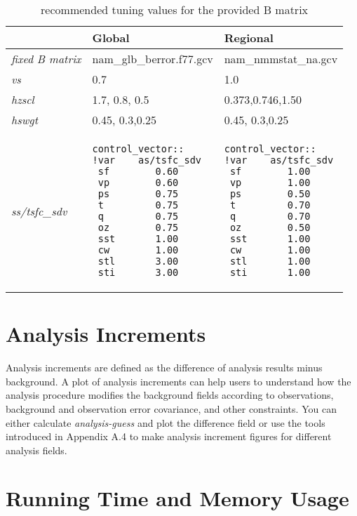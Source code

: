 \begin{table}[htbp]
\centering
\caption{recommended tuning values for the provided B matrix}
\begin{tabular}{|p{2cm}|p{5cm}|p{5cm}|}
\hline
\hline
  & Global & Regional   \\
\hline
\textit{fixed B matrix} & nam\_glb\_berror.f77.gcv & nam\_nmmstat\_na.gcv \\
\hline
\textit{vs} & 0.7 & 1.0\\
\hline
\textit{hzscl} & 1.7, 0.8, 0.5 & 0.373,0.746,1.50\\
\hline
\textit{hswgt} & 0.45, 0.3,0.25 & 0.45, 0.3,0.25\\
\hline
\textit{ss/tsfc\_sdv} & 
\begin{verbatim}
control_vector:: 
!var    as/tsfc_sdv
 sf        0.60
 vp        0.60
 ps        0.75
 t         0.75
 q         0.75
 oz        0.75
 sst       1.00
 cw        1.00
 stl       3.00
 sti       3.00
\end{verbatim}
 & 
\begin{verbatim}
control_vector::
!var    as/tsfc_sdv
 sf        1.00
 vp        1.00
 ps        0.50
 t         0.70
 q         0.70
 oz        0.50
 sst       1.00
 cw        1.00
 stl       1.00
 sti       1.00
\end{verbatim}
\\
\hline
\end{tabular}
\label{tab411}
\end{table} 

\section{Analysis Increments}

Analysis increments are defined as the difference of analysis results minus background. A plot of analysis increments can help users to understand how the analysis procedure modifies the background fields according to observations, background and observation error covariance, and other constraints. You can either calculate \textit{analysis-guess} and plot the difference field or use the tools introduced in Appendix A.4 to make analysis increment figures for different analysis fields.

\section{Running Time and Memory Usage}

